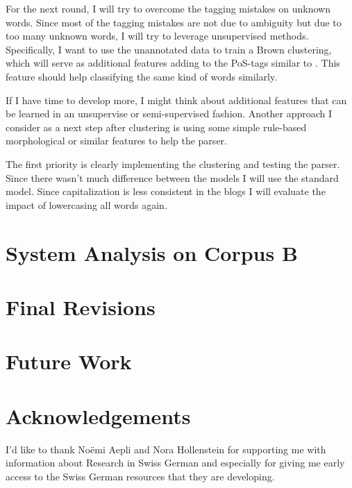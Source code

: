 \documentclass[11pt,letterpaper, covington]{article}
\begin{document}
For the next round, I will try to overcome the tagging mistakes on unknown words. Since most of the tagging mistakes are not due to ambiguity but due to too many unknown words, I will try to leverage unsupervised methods. Specifically, I want to use the unannotated data to train a Brown clustering, which will serve as additional features adding to the PoS-tags similar to \citet{KCC08}. This feature should help classifying the same kind of words similarly. 

If I have time to develop more, I might think about additional features that can be learned in an unsupervise or semi-supervised fashion. Another approach I consider as a next step after clustering is using some simple rule-based morphological or similar features to help the parser. 

The first priority is clearly implementing the clustering and testing the parser. Since there wasn't much difference between the models I will use the standard model. Since capitalization is less consistent in the blogs I will evaluate the impact of lowercasing all words again. 

\section{System Analysis on Corpus B}

\section{Final Revisions}

\section{Future Work}


\section{Acknowledgements}
I'd like to thank Noëmi Aepli and Nora Hollenstein for supporting me with information about Research in Swiss German and especially for giving me early access to the Swiss German resources that they are developing. 



\label{lastpage}
\end{document}

